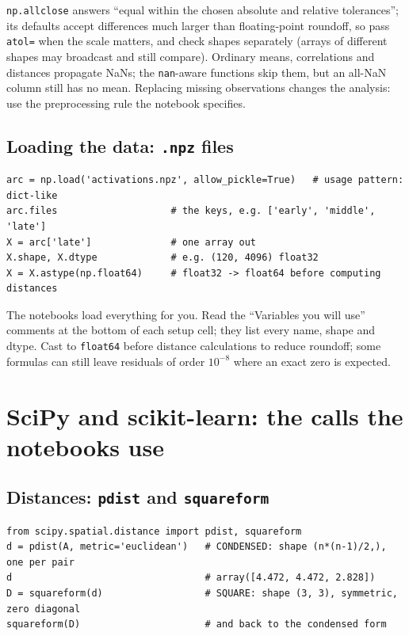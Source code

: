 \documentclass[11pt]{article}
\begin{document}
\texttt{np.allclose} answers ``equal within the chosen absolute and relative tolerances'';
its defaults accept differences much larger than floating-point roundoff, so pass
\texttt{atol=} when the scale matters, and check shapes separately (arrays of different
shapes may broadcast and still compare). Ordinary means, correlations and distances
propagate NaNs; the \texttt{nan}-aware functions skip them, but an all-NaN column still
has no mean. Replacing missing observations changes the analysis: use the preprocessing
rule the notebook specifies.

\subsection{Loading the data: \texttt{.npz} files}

\begin{codebox}
\begin{verbatim}
arc = np.load('activations.npz', allow_pickle=True)   # usage pattern: dict-like
arc.files                    # the keys, e.g. ['early', 'middle', 'late']
X = arc['late']              # one array out
X.shape, X.dtype             # e.g. (120, 4096) float32
X = X.astype(np.float64)     # float32 -> float64 before computing distances
\end{verbatim}
\end{codebox}

The notebooks load everything for you. Read the ``Variables you will use'' comments at
the bottom of each setup cell; they list every name, shape and dtype. Cast to
\texttt{float64} before distance calculations to reduce roundoff; some formulas can still
leave residuals of order $10^{-8}$ where an exact zero is expected.

\section{SciPy and scikit-learn: the calls the notebooks use}\label{sec:calls}

\subsection{Distances: \texttt{pdist} and \texttt{squareform}}

\begin{codebox}
\begin{verbatim}
from scipy.spatial.distance import pdist, squareform
d = pdist(A, metric='euclidean')   # CONDENSED: shape (n*(n-1)/2,), one per pair
d                                  # array([4.472, 4.472, 2.828])
D = squareform(d)                  # SQUARE: shape (3, 3), symmetric, zero diagonal
squareform(D)                      # and back to the condensed form
\end{verbatim}
\end{codebox}
\end{document}
